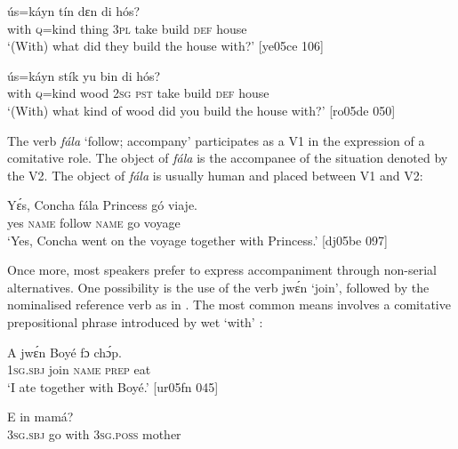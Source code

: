 \ea%
    \label{ex:key:1571}
    \gll {}    ús=káyn  tín    dɛn       di  hós?\\
with    \textsc{q}=kind  thing  \textsc{3pl}  take  build  \textsc{def}  house\\

\glt ‘(With) what did they build the house with?’ [ye05ce 106]
\z


\ea%
    \label{ex:key:1572}
    \gll {}    ús=káyn  stík    yu  bin         di  hós?\\
with    \textsc{q}=kind  wood  \textsc{2sg}  \textsc{pst}  take    build  \textsc{def}  house\\

\glt ‘(With) what kind of wood did you build the house with?’ [ro05de 050]
\z

The verb \textit{fála} ‘follow; accompany’ participates as a V1 in the expression of a comitative role. The object of \textit{fála} is the accompanee of the situation denoted by the V2. The object of \textit{fála} is usually human and placed between V1 and V2:


\ea%
    \label{ex:key:1573}
    \gll Yɛ́s,    Concha  fála    Princess    gó  viaje.\\
yes    \textsc{name}  follow  \textsc{name}    go  voyage\\

\glt ‘Yes, Concha went on the voyage together with Princess.’ [dj05be 097]
\z

Once more, most speakers prefer to express accompaniment through non-serial alternatives. One possibility is the use of the verb jwɛ́n ‘join’, followed by the nominalised reference verb{\fff} as in . The most common means involves a comitative prepositional phrase introduced by wet ‘with’ :


\ea%
    \label{ex:key:1574}
    \gll A    jwɛ́n  Boyé  fɔ  chɔ́p.\\
\textsc{1sg.sbj}  join    \textsc{name}  \textsc{prep}  eat\\

\glt ‘I ate together with Boyé.’ [ur05fn 045]
\z


\ea%
    \label{ex:key:1575}
    \gll E          in    mamá?\\
\textsc{3sg.sbj}  go  with    \textsc{3sg.poss}  mother\\

